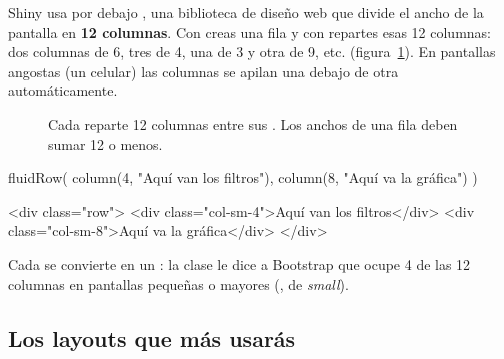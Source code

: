 Shiny usa por debajo , una biblioteca de diseño web que
divide el ancho de la pantalla en \textbf{12 columnas}. Con
 creas una fila y con  repartes
esas 12 columnas: dos columnas de 6, tres de 4, una de 3 y otra de 9, etc.
(figura~\ref{fig:m6-cuadricula}). En pantallas angostas (un celular) las
columnas se apilan una debajo de otra automáticamente.

\begin{figure}[H]
\centering
{}
\caption{Cada  reparte 12 columnas entre sus
. Los anchos de una fila deben sumar 12 o menos.}
\label{fig:m6-cuadricula}
\end{figure}

\begin{rcode}
fluidRow(
  column(4, "Aquí van los filtros"),
  column(8, "Aquí va la gráfica")
)
\end{rcode}
\begin{rsalida}
<div class="row">
  <div class="col-sm-4">Aquí van los filtros</div>
  <div class="col-sm-8">Aquí va la gráfica</div>
</div>
\end{rsalida}

Cada  se convierte en un : la clase le dice a Bootstrap que ocupe 4 de las 12
columnas en pantallas pequeñas o mayores (, de \emph{small}).

\subsection{Los layouts que más usarás}

